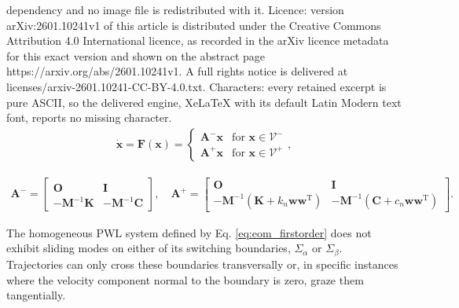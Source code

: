 \documentclass[10pt,a4paper]{amsart}
\newcommand{\T}{^{\mathrm{T}}}
\newcommand{\cVminus}{\mathcal{V}^-}
\newcommand{\cVplus}{\mathcal{V}^+}
\newcommand{\vA}{\mathbf A}
\newcommand{\vC}{\mathbf C}
\newcommand{\vF}{\mathbf F}
\newcommand{\vI}{\mathbf I}
\newcommand{\vK}{\mathbf K}
\newcommand{\vM}{\mathbf M}
\newcommand{\vO}{\mathbf O}
\newcommand{\vw}{\mathbf w}
\newcommand{\vx}{\mathbf x}
\begin{document}
dependency and no image file is redistributed with it. Licence: version arXiv:2601.10241v1 of this article is distributed under the Creative Commons Attribution 4.0 International licence, as recorded in the arXiv licence metadata for this exact version and shown on the abstract page https://arxiv.org/abs/2601.10241v1. A full rights notice is delivered at licenses/arxiv-2601.10241-CC-BY-4.0.txt. Characters: every retained excerpt is pure ASCII, so the delivered engine, XeLaTeX with its default Latin Modern text font, reports no missing character.
\begin{align}\label{eq:eom_firstorder}
	\dot{\vx} = \vF(\vx) = \begin{cases} \vA^- \vx & \text{for } \vx \in \cVminus \\ \vA^+ \vx & \text{for } \vx \in \cVplus \end{cases},
\end{align}

\begin{align}\label{eq:sys_matrices}
	\vA^- = \begin{bmatrix} \vO & \vI \\ -\vM^{-1}\vK & -\vM^{-1}\vC \end{bmatrix}, \quad \vA^+ = \begin{bmatrix} \vO & \vI \\ -\vM^{-1}(\vK + k_n\vw\vw\T) & -\vM^{-1}(\vC + c_n\vw\vw\T) \end{bmatrix}.
\end{align}

\begin{proposition}\label{prop:no_sliding}
	The homogeneous PWL system defined by Eq. \eqref{eq:eom_firstorder} does not exhibit sliding modes on either of its switching boundaries, $\Sigma_{\alpha}$ or $\Sigma_{\beta}$. Trajectories can only cross these boundaries transversally or, in specific instances where the velocity component normal to the boundary is zero, graze them tangentially.
\end{proposition}
\end{document}
